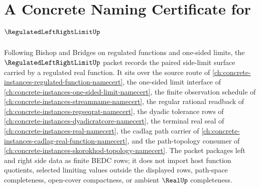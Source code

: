 \chapter{A Concrete Naming Certificate for $\RegulatedLeftRightLimitUp$}
\label{ch:concrete-instances-regulated-left-right-limit-namecert}

Following Bishop and Bridges on regulated functions and one-sided limits, the $\RegulatedLeftRightLimitUp$ packet records the paired side-limit surface carried by a regulated real function. It sits over the source route of \autoref{ch:concrete-instances-regulated-function-namecert}, the one-sided limit interface of \autoref{ch:concrete-instances-one-sided-limit-namecert}, the finite observation schedule of \autoref{ch:concrete-instances-streamname-namecert}, the regular rational readback of \autoref{ch:concrete-instances-regseqrat-namecert}, the dyadic tolerance rows of \autoref{ch:concrete-instances-dyadicratcore-namecert}, the terminal real seal of \autoref{ch:concrete-instances-real-namecert}, the cadlag path carrier of \autoref{ch:concrete-instances-cadlag-real-function-namecert}, and the path-topology consumer of \autoref{ch:concrete-instances-skorokhod-topology-namecert}. The packet packages left and right side data as finite BEDC rows; it does not import host function quotients, selected limiting values outside the displayed rows, path-space completeness, open-cover compactness, or ambient $\RealUp$ completeness.

